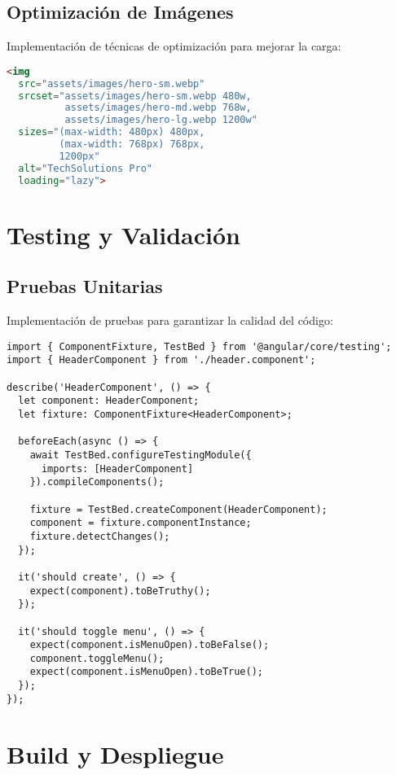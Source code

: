 \subsection{Optimización de Imágenes}

Implementación de técnicas de optimización para mejorar la carga:

\begin{lstlisting}[language=html, caption=Optimized Images]
<img 
  src="assets/images/hero-sm.webp" 
  srcset="assets/images/hero-sm.webp 480w,
          assets/images/hero-md.webp 768w,
          assets/images/hero-lg.webp 1200w"
  sizes="(max-width: 480px) 480px,
         (max-width: 768px) 768px,
         1200px"
  alt="TechSolutions Pro"
  loading="lazy">
\end{lstlisting}

\section{Testing y Validación}

\subsection{Pruebas Unitarias}

Implementación de pruebas para garantizar la calidad del código:

\begin{lstlisting}[caption=Component Testing]
import { ComponentFixture, TestBed } from '@angular/core/testing';
import { HeaderComponent } from './header.component';

describe('HeaderComponent', () => {
  let component: HeaderComponent;
  let fixture: ComponentFixture<HeaderComponent>;

  beforeEach(async () => {
    await TestBed.configureTestingModule({
      imports: [HeaderComponent]
    }).compileComponents();

    fixture = TestBed.createComponent(HeaderComponent);
    component = fixture.componentInstance;
    fixture.detectChanges();
  });

  it('should create', () => {
    expect(component).toBeTruthy();
  });

  it('should toggle menu', () => {
    expect(component.isMenuOpen).toBeFalse();
    component.toggleMenu();
    expect(component.isMenuOpen).toBeTrue();
  });
});
\end{lstlisting}

\section{Build y Despliegue}

